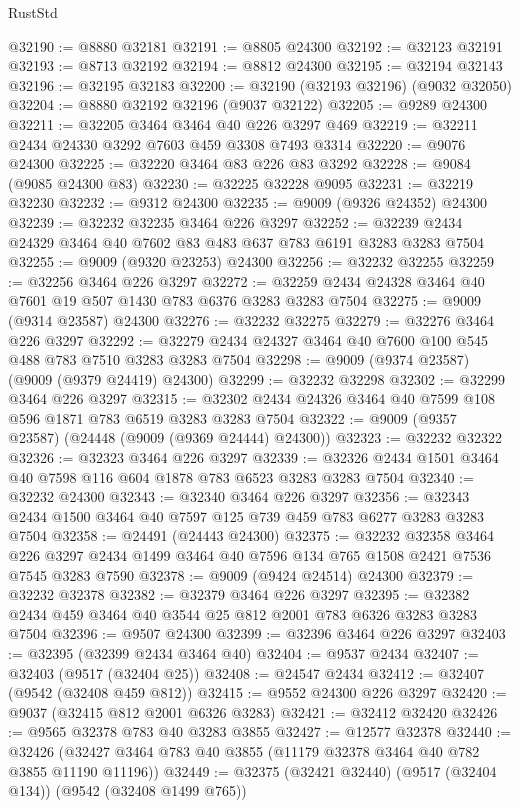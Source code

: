 \begin{lexlean}{RustStd}
\begin{coremodule}
@32190 := @8880 @32181
@32191 := @8805 @24300
@32192 := @32123 @32191
@32193 := @8713 @32192
@32194 := @8812 @24300
@32195 := @32194 @32143
@32196 := @32195 @32183
@32200 := @32190 (@32193 @32196) (@9032 @32050)
@32204 := @8880 @32192 @32196 (@9037 @32122)
@32205 := @9289 @24300
@32211 := @32205 @3464 @3464 @40 @226 @3297 @469
@32219 := @32211 @2434 @24330 @3292 @7603 @459 @3308 @7493 @3314
@32220 := @9076 @24300
@32225 := @32220 @3464 @83 @226 @83 @3292
@32228 := @9084 (@9085 @24300 @83)
@32230 := @32225 @32228 @9095
@32231 := @32219 @32230
@32232 := @9312 @24300
@32235 := @9009 (@9326 @24352) @24300
@32239 := @32232 @32235 @3464 @226 @3297
@32252 := @32239 @2434 @24329 @3464 @40 @7602 @83 @483 @637 @783 @6191 @3283 @3283 @7504
@32255 := @9009 (@9320 @23253) @24300
@32256 := @32232 @32255
@32259 := @32256 @3464 @226 @3297
@32272 := @32259 @2434 @24328 @3464 @40 @7601 @19 @507 @1430 @783 @6376 @3283 @3283 @7504
@32275 := @9009 (@9314 @23587) @24300
@32276 := @32232 @32275
@32279 := @32276 @3464 @226 @3297
@32292 := @32279 @2434 @24327 @3464 @40 @7600 @100 @545 @488 @783 @7510 @3283 @3283 @7504
@32298 := @9009 (@9374 @23587) (@9009 (@9379 @24419) @24300)
@32299 := @32232 @32298
@32302 := @32299 @3464 @226 @3297
@32315 := @32302 @2434 @24326 @3464 @40 @7599 @108 @596 @1871 @783 @6519 @3283 @3283 @7504
@32322 := @9009 (@9357 @23587) (@24448 (@9009 (@9369 @24444) @24300))
@32323 := @32232 @32322
@32326 := @32323 @3464 @226 @3297
@32339 := @32326 @2434 @1501 @3464 @40 @7598 @116 @604 @1878 @783 @6523 @3283 @3283 @7504
@32340 := @32232 @24300
@32343 := @32340 @3464 @226 @3297
@32356 := @32343 @2434 @1500 @3464 @40 @7597 @125 @739 @459 @783 @6277 @3283 @3283 @7504
@32358 := @24491 (@24443 @24300)
@32375 := @32232
    @32358
    @3464
    @226
    @3297
    @2434
    @1499
    @3464
    @40
    @7596
    @134
    @765
    @1508
    @2421
    @7536
    @7545
    @3283
    @7590
@32378 := @9009 (@9424 @24514) @24300
@32379 := @32232 @32378
@32382 := @32379 @3464 @226 @3297
@32395 := @32382 @2434 @459 @3464 @40 @3544 @25 @812 @2001 @783 @6326 @3283 @3283 @7504
@32396 := @9507 @24300
@32399 := @32396 @3464 @226 @3297
@32403 := @32395 (@32399 @2434 @3464 @40)
@32404 := @9537 @2434
@32407 := @32403 (@9517 (@32404 @25))
@32408 := @24547 @2434
@32412 := @32407 (@9542 (@32408 @459 @812))
@32415 := @9552 @24300 @226 @3297
@32420 := @9037 (@32415 @812 @2001 @6326 @3283)
@32421 := @32412 @32420
@32426 := @9565 @32378 @783 @40 @3283 @3855
@32427 := @12577 @32378
@32440 := @32426 (@32427 @3464 @783 @40 @3855 (@11179 @32378 @3464 @40 @782 @3855 @11190 @11196))
@32449 := @32375 (@32421 @32440) (@9517 (@32404 @134)) (@9542 (@32408 @1499 @765))

\end{coremodule}
\end{lexlean}
